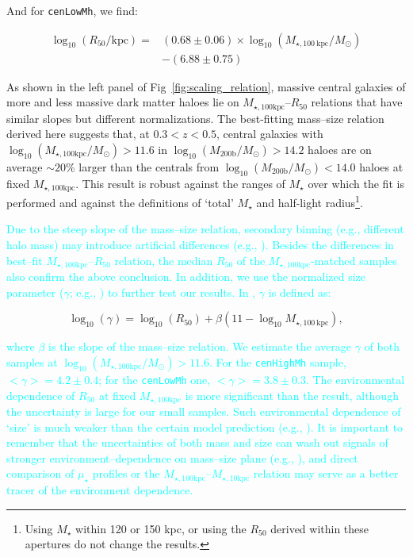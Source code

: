 \documentclass[a4paper,fleqn,usenatbib]{mnras}
\def\rbcg{\texttt{cenHighMh}}
\def\nbcg{\texttt{cenLowMh}}
\def\mstar{{$M_{\star}$}}
\def\logmhalo{{$\log_{10} (M_{\mathrm{200b}}/M_{\odot})$}}
\def\minn{{$M_{\star,10\mathrm{kpc}}$}}
\def\mtot{{$M_{\star,100\mathrm{kpc}}$}}
\def\logmtot{{$\log_{10} (M_{\star,100\mathrm{kpc}}/M_{\odot})$}}
\def\mden{{$\mu_{\star}$}}
\newcommand{\song}[1]{\textcolor{cyan}{#1}}
\begin{document}
    \noindent And for \nbcg{}, we find:
    
    \begin{equation}
        \begin{aligned}
        \log_{10} (R_{\mathrm{50}}/\mathrm{kpc}) = & (0.68\pm0.06) \times \log_{10} (M_{\star, 100\ \mathrm{kpc}}/M_{\odot}) \\ & -(6.88\pm0.75)
        \end{aligned}
    \end{equation}
    
    \noindent As shown in the left panel of Fig~\ref{fig:scaling_relation}, 
    massive central galaxies of more and less massive dark matter haloes lie on 
    \mtot{}--$R_{\mathrm{50}}$ relations that have similar slopes but 
    different normalizations. 
    The best-fitting mass--size relation derived here suggests that, 
    at $0.3 < z < 0.5$, central galaxies with \logmtot{}$>11.6$ in \logmhalo{}$>14.2$
    haloes are on average $\sim20$\% larger than the centrals from \logmhalo{}$<14.0$
    haloes at fixed \mtot{}.
    This result is robust against the ranges of \mstar{} over which the fit is 
    performed and against the definitions of  `total' \mstar{} and half-light 
    radius\footnote{Using \mstar{} within 120 or 150 kpc, or using the 
    $R_{\mathrm{50}}$ derived within these apertures do not change the results.}. 
    
    \song{
    Due to the steep slope of the mass--size relation, secondary binning 
    (e.g., different halo mass) may introduce artificial differences 
    (e.g., \citealt{Sonnenfeld2017}).
    Besides the differences in best--fit \mtot{}--$R_{\mathrm{50}}$ relation, the 
    median $R_{\mathrm{50}}$ of the \mtot{}-matched samples also confirm the above 
    conclusion. 
    In addition, we use the normalized size parameter ($\gamma$; e.g., 
    \citealt{Newman2012, HCompany13}) to further test our results. 
    In \citet{HCompany13}, $\gamma$ is defined as:
    }
    
    \begin{equation}
        \log_{10}(\gamma) = \log_{10} (R_{\mathrm{50}}) + \beta (11 - \log_{10}M_{\star, 100\ \mathrm{kpc}}),
    \end{equation}
    
    \song{
    where $\beta$ is the slope of the mass--size relation.
    We estimate the average $\gamma$ of both samples at \logmtot{}$>11.6$. 
    For the \rbcg{} sample, $<\gamma> = 4.2\pm0.4$; for the \nbcg{} one, 
    $<\gamma> = 3.8\pm0.3$. 
    The environmental dependence of $R_{\mathrm{50}}$ at fixed \mtot{} is more 
    significant than the \citet{HCompany13} result, although the uncertainty 
    is large for our small samples. 
    Such environmental dependence of `size' is much weaker than the certain 
    model prediction (e.g., \citealt{Shankar2014}).
    It is important to remember that the uncertainties of both mass and size can 
    wash out signals of stronger environment--dependence on mass--size plane 
    (e.g., \citealt{HCompany13}), and direct comparison of \mden{} profiles or 
    the \mtot{}--\minn{} relation may serve as a better tracer of the environment 
    dependence. 
    }
    
\end{document}

